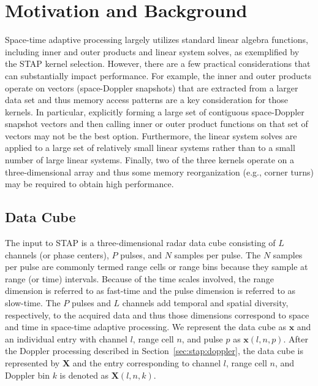 \documentclass{report}
\begin{document}

\section{Motivation and Background}

Space-time adaptive processing largely utilizes standard linear algebra
functions, including inner and outer products and linear system
solves, as exemplified by the STAP kernel selection.
However, there are a few practical considerations that can substantially
impact performance.
For example, the inner and outer products operate on vectors
(space-Doppler snapshots) that are extracted from a larger data set
and thus memory access patterns are a key consideration for those
kernels.
In particular, explicitly forming a large set of contiguous
space-Doppler snapshot vectors and then calling inner or outer product functions
on that set of vectors may not be the best option.
Furthermore, the linear system solves are applied to a large set
of relatively small linear systems rather than to a small number
of large linear systems.
Finally, two of the three kernels operate on a three-dimensional
array and thus some memory reorganization (e.g., corner turns) may
be required to obtain high performance.

\subsection{Data Cube}
\label{sec:stap:datacube}

The input to STAP is a three-dimensional radar data cube consisting of
$L$ channels (or phase centers), $P$ pulses, and $N$ samples per pulse.
The $N$ samples per pulse are commonly termed range cells or range bins
because they sample at range (or time) intervals.
Because of the time scales involved, the range dimension is referred to
as fast-time and the pulse dimension is referred to as slow-time.
The $P$ pulses and $L$ channels add temporal and spatial diversity,
respectively, to the acquired data and thus those dimensions correspond
to space and time in space-time adaptive processing.
We represent the data cube as $\mathbf{x}$ and an individual entry with
channel $l$, range cell $n$, and pulse $p$ as $\mathbf{x}(l,n,p)$.
After the Doppler processing described in Section~\ref{sec:stap:doppler},
the data cube is represented by $\mathbf{X}$ and the entry corresponding
to channel $l$, range cell $n$, and Doppler bin $k$ is denoted
as $\mathbf{X}(l,n,k)$.
\end{document}
